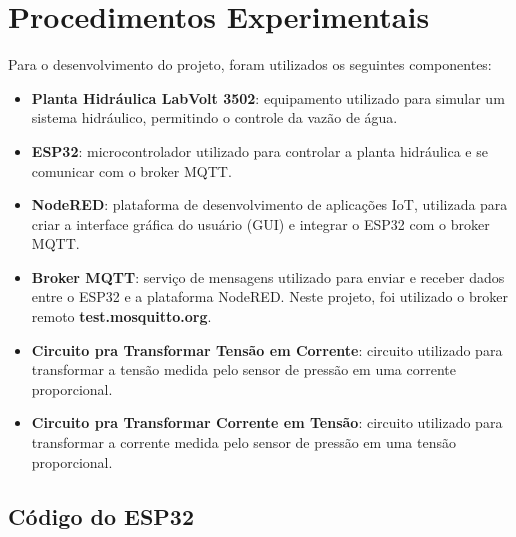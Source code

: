 \documentclass[a4paper,12pt]{article}
\begin{document}
\section{Procedimentos Experimentais}
\par Para o desenvolvimento do projeto, foram utilizados os seguintes componentes:
\begin{itemize}
    \item \textbf{Planta Hidráulica LabVolt 3502}: equipamento utilizado para simular um sistema hidráulico, permitindo o controle da vazão de água.
    \item \textbf{ESP32}: microcontrolador utilizado para controlar a planta hidráulica e se comunicar com o broker MQTT.
    \item \textbf{NodeRED}: plataforma de desenvolvimento de aplicações IoT, utilizada para criar a interface gráfica do usuário (GUI) e integrar o ESP32 com o broker MQTT.
    \item \textbf{Broker MQTT}: serviço de mensagens utilizado para enviar e receber dados entre o ESP32 e a plataforma NodeRED. Neste projeto, foi utilizado o broker remoto \textbf{test.mosquitto.org}.
    \item \textbf{Circuito pra Transformar Tensão em Corrente}: circuito utilizado para transformar a tensão medida pelo sensor de pressão em uma corrente proporcional.
    \item \textbf{Circuito pra Transformar Corrente em Tensão}: circuito utilizado para transformar a corrente medida pelo sensor de pressão em uma tensão proporcional.
\end{itemize}

\subsection{Código do ESP32}
\end{document}
